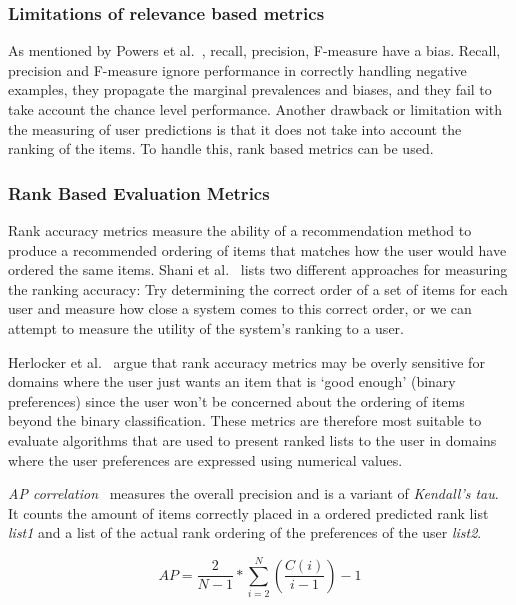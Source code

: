 \subsubsection{Limitations of relevance based metrics}
\label{subsec:limitations-relevancebased}

As mentioned by Powers et al.~\cite{powers2007}, recall, precision, F-measure
have a bias.  Recall, precision and F-measure ignore performance in correctly
handling negative examples, they propagate the marginal prevalences and biases,
and they fail to take account the chance level performance.  Another drawback
or limitation with the measuring of user predictions is that it does not take
into account the ranking of the items. To handle this, rank based metrics can
be used.

\subsubsection{Rank Based Evaluation Metrics}
\label{subsec:rankbased}

Rank accuracy metrics measure the ability of a recommendation method to produce
a recommended ordering of items that matches how the user would have ordered
the same items. Shani et al.~\cite{Shani2011} lists two different approaches
for measuring the ranking accuracy: Try determining the correct order of a set
of items for each user and measure how close a system comes to this correct
order, or we can attempt to measure the utility of the system's ranking to a
user.

Herlocker et al.~\cite{Herlocker2004} argue that rank accuracy metrics may be
overly sensitive for domains where the user just wants an item that is `good
enough' (binary preferences) since the user won't be concerned about the
ordering of items beyond the binary classification. These metrics are therefore
most suitable to evaluate algorithms that are used to present ranked lists to
the user in domains where the user preferences are expressed using numerical
values.

\textit{AP correlation}~\cite{Yilmaz:2008:NRC:1390334.1390435} measures the
overall precision and is a variant of \textit{Kendall's tau}.  It counts the
amount of items correctly placed in a ordered predicted rank list
\textit{list1} and a list of the actual rank ordering of the preferences of the
user \textit{list2}.

\begin{equation}
	AP = \frac{2}{N - 1} * \sum_{i=2}^{N}{(\frac{C(i)}{i - 1})} - 1
	\label{equation:ap}
\end{equation}

